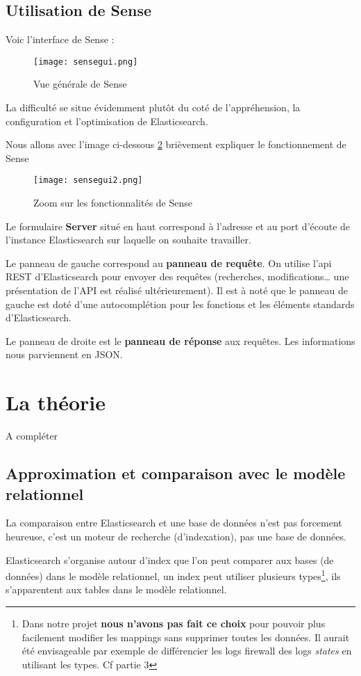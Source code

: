 \subsection{Utilisation de Sense}
Voic l'interface de Sense :

\begin{figure}[H]
\center
\texttt{[image: sensegui.png]}
\label{fig:sensegui.png}
\caption{Vue générale de Sense}
\end{figure}

La difficulté se situe évidemment plutôt du coté de l'appréhension, la configuration
et l'optimisation de Elasticsearch.

Nous allons avec l'image ci-dessous \ref{fig:sensegui2.png} brièvement expliquer le fonctionnement de Sense
\begin{figure}[H]
\center
\texttt{[image: sensegui2.png]}
\label{fig:sensegui2.png}
\caption{Zoom sur les fonctionnalités de Sense}
\end{figure}
Le formulaire \textbf{Server} situé en haut correspond à l'adresse et au port d'écoute 
de l'instance Elasticsearch sur laquelle on souhaite travailler.

Le panneau de gauche correspond au \textbf{panneau de requête}. On utilise l'api 
REST d'Elasticsearch pour envoyer des requêtes (recherches, modifications\ldots 
une présentation de l'API est réalisé ultérieurement). Il est à noté que le panneau 
de gauche est doté d'une autocomplétion pour les fonctions et les éléments standards 
d'Elasticsearch.

Le panneau de droite est le \textbf{panneau de réponse} aux requêtes. Les informations
nous parviennent en JSON.

\section{La théorie}
{\huge A compléter}

\subsection{Approximation et comparaison avec le modèle relationnel}
La comparaison entre Elasticsearch et une base de données n'est pas forcement heureuse,
c'est un moteur de recherche (d'indexation), pas une base de données. 

Elasticsearch s'organise autour d'index que l'on peut comparer aux bases (de données)
dans le modèle relationnel, un index peut utiliser plusieurs types\footnote{Dans 
notre projet \textbf{nous n'avons pas fait ce choix} pour pouvoir plus facilement 
modifier les mappings sans supprimer toutes les données. Il aurait été envisageable
par exemple de différencier les logs firewall des logs \textit{states} en utilisant 
les types. Cf partie 3}, ils s'apparentent aux tables dans le modèle relationnel. 

